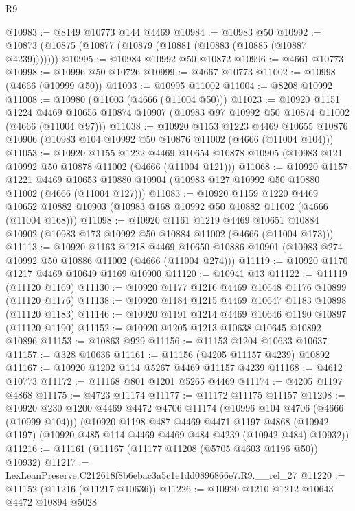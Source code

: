 \begin{lexlean}{R9}
\begin{coremodule}
@10983 := @8149 @10773 @144 @4469
@10984 := @10983 @50
@10992 := @10873 (@10875 (@10877 (@10879 (@10881 (@10883 (@10885 (@10887 @4239)))))))
@10995 := @10984 @10992 @50 @10872
@10996 := @4661 @10773
@10998 := @10996 @50 @10726
@10999 := @4667 @10773
@11002 := @10998 (@4666 (@10999 @50))
@11003 := @10995 @11002
@11004 := @8208 @10992
@11008 := @10980 (@11003 (@4666 (@11004 @50)))
@11023 := @10920
    @1151
    @1224
    @4469
    @10656
    @10874
    @10907
    (@10983 @97 @10992 @50 @10874 @11002 (@4666 (@11004 @97)))
@11038 := @10920
    @1153
    @1223
    @4469
    @10655
    @10876
    @10906
    (@10983 @104 @10992 @50 @10876 @11002 (@4666 (@11004 @104)))
@11053 := @10920
    @1155
    @1222
    @4469
    @10654
    @10878
    @10905
    (@10983 @121 @10992 @50 @10878 @11002 (@4666 (@11004 @121)))
@11068 := @10920
    @1157
    @1221
    @4469
    @10653
    @10880
    @10904
    (@10983 @127 @10992 @50 @10880 @11002 (@4666 (@11004 @127)))
@11083 := @10920
    @1159
    @1220
    @4469
    @10652
    @10882
    @10903
    (@10983 @168 @10992 @50 @10882 @11002 (@4666 (@11004 @168)))
@11098 := @10920
    @1161
    @1219
    @4469
    @10651
    @10884
    @10902
    (@10983 @173 @10992 @50 @10884 @11002 (@4666 (@11004 @173)))
@11113 := @10920
    @1163
    @1218
    @4469
    @10650
    @10886
    @10901
    (@10983 @274 @10992 @50 @10886 @11002 (@4666 (@11004 @274)))
@11119 := @10920 @1170 @1217 @4469 @10649 @1169 @10900
@11120 := @10941 @13
@11122 := @11119 (@11120 @1169)
@11130 := @10920 @1177 @1216 @4469 @10648 @1176 @10899 (@11120 @1176)
@11138 := @10920 @1184 @1215 @4469 @10647 @1183 @10898 (@11120 @1183)
@11146 := @10920 @1191 @1214 @4469 @10646 @1190 @10897 (@11120 @1190)
@11152 := @10920 @1205 @1213 @10638 @10645 @10892 @10896
@11153 := @10863 @929
@11156 := @11153 @1204 @10633 @10637
@11157 := @328 @10636
@11161 := @11156 (@4205 @11157 @4239) @10892
@11167 := @10920 @1202 @114 @5267 @4469 @11157 @4239
@11168 := @4612 @10773
@11172 := @11168 @801 @1201 @5265 @4469
@11174 := @4205 @1197 @4868
@11175 := @4723 @11174
@11177 := @11172 @11175 @11157
@11208 := @10920
    @230
    @1200
    @4469
    @4472
    @4706
    @11174
    (@10996 @104 @4706 (@4666 (@10999 @104)))
    (@10920
      @1198
      @487
      @4469
      @4471
      @1197
      @4868
      (@10942 @1197)
      (@10920 @485 @114 @4469 @4469 @484 @4239 (@10942 @484) @10932))
@11216 := @11161 (@11167 (@11177 @11208 (@5705 @4603 @1196 @50)) @10932)
@11217 := LexLeanPreserve.C212618f8b6ebac3a5c1e1dd0896866e7.R9.__rel_27
@11220 := @11152 (@11216 (@11217 @10636))
@11226 := @10920 @1210 @1212 @10643 @4472 @10894 @5028

\end{coremodule}
\end{lexlean}
